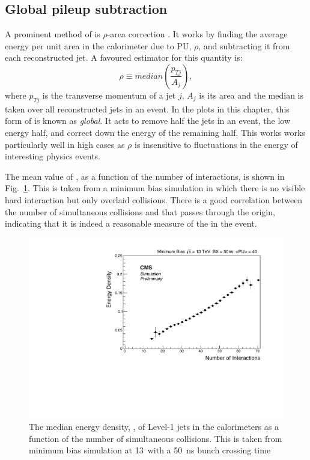 \subsection{Global pileup subtraction}

A prominent method of \PUS is $\rho$-area correction
\cite{Cacciari:2007fd,Cacciari:2008gn}. It works by finding the
average energy per unit area in the calorimeter due to PU, $\rho$, and
subtracting it from each reconstructed jet. A favoured estimator for this
quantity is:
\begin{equation}
\rho\equiv median(\frac{p_{Tj}}{A_j}),
\end{equation}
where $p_{Tj}$ is the transverse momentum of a jet $j$, $A_j$ is its
area and the median is taken over all reconstructed jets in an event.
In the plots in this chapter, this form of \PUS is known as \emph{global}. It
acts to remove half the jets in an event, the low energy half, and
correct down the energy of the remaining half. This works works
particularly well in high \PU cases as $\rho$ is insensitive to
fluctuations in the energy of interesting physics events. 

The mean value of \rho, as a function of the number of interactions, is
shown in Fig.~\ref{fig:rho}. This is taken from a minimum bias \MC
simulation in which there is no visible hard interaction but only
overlaid \PU collisions. There is a good correlation between the
number of simultaneous collisions and \rho that passes through the
origin, indicating that it is indeed a reasonable measure of the \PU
in the event. 

\begin{figure}
	\begin{center}
		\includegraphics[width=0.8\linewidth]{figs/trigger/median}
  \caption{The median energy density, \rho, of Level-1 jets in the \CMS
  calorimeters as a function of the number of simultaneous collisions.
  This is taken from minimum bias \MC simulation at 13~\tev with a
  50~ns bunch crossing time}
	\label{fig:rho}
	\end{center}
\end{figure}

